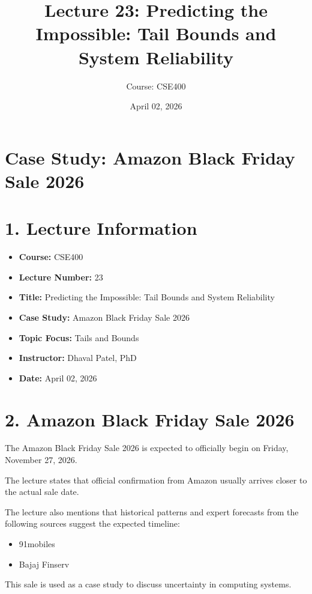 \documentclass[12pt]{article}
\title{\textbf{Lecture 23: Predicting the Impossible: Tail Bounds and System Reliability}}
\author{Course: CSE400}
\date{April 02, 2026}
\begin{document}
\maketitle

\section*{Case Study: Amazon Black Friday Sale 2026}

\section*{1. Lecture Information}

\begin{itemize}[leftmargin=0.6in]
    \item \textbf{Course:} CSE400
    \item \textbf{Lecture Number:} 23
    \item \textbf{Title:} Predicting the Impossible: Tail Bounds and System Reliability
    \item \textbf{Case Study:} Amazon Black Friday Sale 2026
    \item \textbf{Topic Focus:} Tails and Bounds
    \item \textbf{Instructor:} Dhaval Patel, PhD
    \item \textbf{Date:} April 02, 2026
\end{itemize}

\section*{2. Amazon Black Friday Sale 2026}

The Amazon Black Friday Sale 2026 is expected to officially begin on Friday, November 27, 2026.

The lecture states that official confirmation from Amazon usually arrives closer to the actual sale date.

The lecture also mentions that historical patterns and expert forecasts from the following sources suggest the expected timeline:

\begin{itemize}
    \item 91mobiles
    \item Bajaj Finserv
\end{itemize}

This sale is used as a case study to discuss uncertainty in computing systems.
\end{document}

